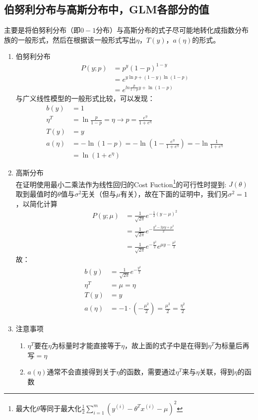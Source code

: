 \subsection{伯努利分布与高斯分布中，GLM各部分的值}
主要是将伯努利分布（即$0-1$分布）与高斯分布的式子尽可能地转化成指数分布族的一般形式，然后在根据该一般形式写出$\eta$，$T(y)$，$a(\eta)$的形式。\\
\begin{enumerate}
	\item 伯努利分布
	\begin{align}
		P(y;p) &= p^y(1-p)^{1-y} \\
		&= e^{y\ln p + (1-y)\ln(1-p)} \\
		&= e^{ln{\frac{p}{1-p}}y + \ln(1-p)}
	\end{align}
	与广义线性模型的一般形式比较，可以发现：
	\begin{align}
		b(y) &= 1 \\
		\eta^T &= \ln{\frac{p}{1-p}} = \eta \rightarrow p = \frac{e^{\eta}}{1+e^{\eta}} \\
		T(y) &= y \\
		a(\eta) &= -\ln(1-p) = -\ln{(1-\frac{e^{\eta}}{1+e^{\eta}})} = -\ln{\frac{1}{1+e^\eta}} \\
		&= \ln(1+e^\eta)
	\end{align}

	\item 高斯分布 \\
	在证明使用最小二乘法作为线性回归的Cost Fuction\footnote{最大化$\theta$等同于最大化$\frac{1}{2} \sum_{i=1}^{m}\left(y^{(i)}-\theta^Tx^{(i)}-\mu\right)^2$}的可行性时提到: $J(\theta)$取到最值时的$\theta$值与$\sigma^2$无关（但与$\mu$有关），故在下面的证明中，我们另$\sigma^2=1$，以简化计算
	\begin{align}
		P(y;\mu) &= \frac{1}{\sqrt{2\pi}}e^{-\frac{1}{2}\left(y-\mu\right)^2} \\
		&= \frac{1}{\sqrt{2\pi}} e^{-\frac{y^2-2\mu y +\mu^2}{2}} \\
		&= \frac{1}{\sqrt{2\pi}}e^{-\frac{y^2}{2}} e^{\mu y-\frac{\mu^2}{2}}
	\end{align}
	故：
	\begin{align}
		b(y) &= \frac{1}{\sqrt{2\pi}}e^{-\frac{y^2}{2}} \\
		\eta^T &= \mu = \eta \\
		T(y) &= y \\
		a(\eta) &= -1\cdot (-\frac{\mu^2}{2}) = \frac{\mu^2}{2} = \frac{\eta^2}{2}
	\end{align}

	\item 注意事项
	\begin{enumerate}
		\item $\eta^T$要在$\eta$为标量时才能直接等于$\eta$，故上面的式子中是在得到$\eta^T$为标量后再写$=\eta$
		\item $a(\eta)$通常不会直接得到关于$\eta$的函数，需要通过$\eta^T$来与$\eta$关联，得到$\eta$的函数
	\end{enumerate}
\end{enumerate}

